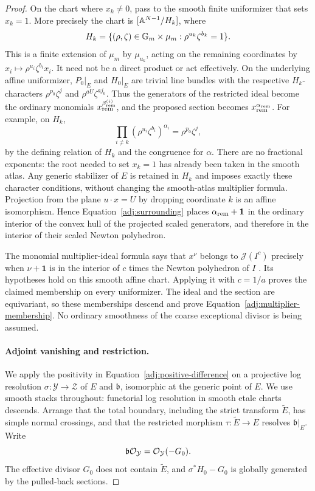 \begin{proof}
On the chart where $x_k\ne0$, pass to the smooth finite uniformizer
that sets $x_k=1$.  More precisely the chart is
$[\mathbb A^{N-1}/H_k]$, where
\[
 H_k=\{(\rho,\zeta)\in\mathbb G_m\times\mu_m:
                    \rho^{u_k}\zeta^{b_k}=1\}.
\]
This is a finite extension of $\mu_m$ by $\mu_{u_k}$, acting on the
remaining coordinates by
$x_i\mapsto\rho^{u_i}\zeta^{b_i}x_i$.  It need not be a direct
product or act effectively.  On the underlying affine uniformizer,
$P_0|_E$ and $H_0|_E$ are trivial line bundles with the respective
$H_k$-characters $\rho^{p_0}\zeta^j$ and
$\rho^{aU}\zeta^{aj_0}$.  Thus the generators of the restricted
ideal become the ordinary monomials
$x_{\rm rem}^{\beta^{(i)}_{\rm rem}}$, and the proposed section
becomes $x_{\rm rem}^{\alpha_{\rm rem}}$.  For example, on $H_k$,
\[
 \prod_{i\ne k}(\rho^{u_i}\zeta^{b_i})^{\alpha_i}
       =\rho^{p_0}\zeta^j,
\]
by the defining relation of $H_k$ and the congruence for $\alpha$.
There are no fractional exponents: the root needed to set $x_k=1$
has already been taken in the smooth atlas.  Any generic stabilizer
of $E$ is retained in $H_k$ and imposes exactly these character
conditions, without changing the smooth-atlas multiplier formula.
Projection from the plane $u\cdot x=U$ by
dropping coordinate $k$ is an affine isomorphism.  Hence
Equation~\eqref{adj:surrounding} places
$\alpha_{\rm rem}+\mathbf1$ in the ordinary interior of the convex
hull of the projected scaled generators, and therefore in the
interior of their scaled Newton polyhedron.

The monomial multiplier-ideal formula says that $x^\nu$ belongs to
$\mathcal J(I^c)$ precisely when $\nu+\mathbf1$ is in the interior
of $c$ times the Newton polyhedron of $I$ \cite{Howald01}.  Its
hypotheses hold on this smooth affine chart.  Applying it with
$c=1/a$ proves the claimed membership on every uniformizer.  The
ideal and the section are equivariant, so these memberships descend
and prove Equation~\eqref{adj:multiplier-membership}.  No ordinary
smoothness of the coarse exceptional divisor is being assumed.

\paragraph{Adjoint vanishing and restriction.}
We apply the positivity in Equation~\eqref{adj:positive-difference}
on a projective log resolution
$\sigma:\mathcal Y\to\mathcal Z$ of $E$ and $\mathfrak b$,
isomorphic at the generic point of $E$.  We use smooth stacks
throughout: functorial log resolution in smooth etale charts
\cite[Theorems~35--36]{KollarResolution07}
descends.  Arrange that the total boundary, including
the strict transform $\widetilde E$, has simple normal crossings,
and that the restricted morphism
$\tau:\widetilde E\to E$ resolves $\mathfrak b|_E$.  Write
\[
 \mathfrak b\mathcal O_{\mathcal Y}=\mathcal O_{\mathcal Y}(-G_0).
\]
The effective divisor $G_0$ does not contain $\widetilde E$, and
$\sigma^*H_0-G_0$ is globally generated by the pulled-back sections.


\end{proof}
